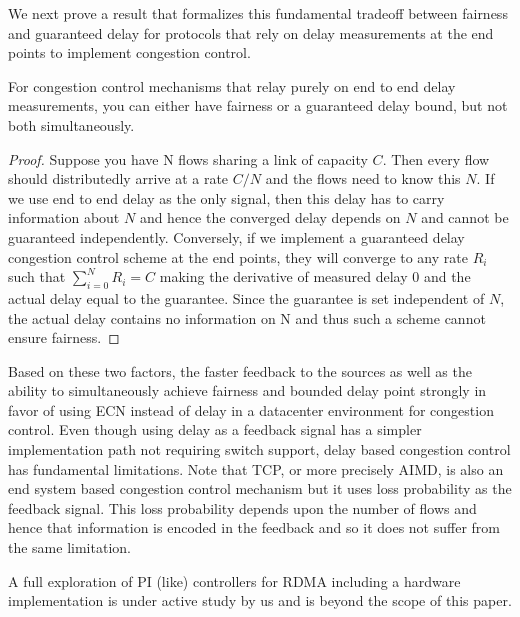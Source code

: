 We next prove a result that formalizes this fundamental tradeoff between fairness
and guaranteed delay for protocols that rely on delay measurements at the end
points to implement congestion control.

\begin{thm}
\label{thm:fairness-delay}
For congestion control mechanisms that relay purely on end to end
delay measurements, you can either have fairness or a guaranteed delay
bound, but not both simultaneously.
\end{thm}
\begin{proof}
Suppose you have N flows sharing a link of capacity $C$. Then every flow
should distributedly arrive at a rate $C/N$ and the flows need to know
this $N$. If we use end to end delay as the only signal, then this delay
has to carry information about $N$ and hence the converged delay
depends on $N$ and cannot be guaranteed independently. Conversely, if we implement a guaranteed delay congestion
control scheme at the end points, they
will converge to any rate $R_i$ such that $\sum_{i=0}^{N}R_i = C$
making the derivative of measured delay 0 and the actual delay equal
to the guarantee. Since the guarantee is set independent of $N$, the
actual delay contains no information on N and 
thus such a scheme cannot ensure fairness.
\end{proof}

\noindent
Based on these two factors, the faster feedback to the sources as well as the
ability to simultaneously achieve fairness and bounded delay point strongly in
favor of using ECN instead of delay in a datacenter environment for congestion
control. Even though using delay as a feedback signal has a simpler
implementation path not requiring switch support, delay based congestion control
has fundamental limitations. Note that TCP, or more precisely AIMD, is also an
end system based congestion control mechanism but it uses loss probability as
the feedback signal. This loss probability depends upon the number of flows and
hence that information is encoded in the feedback and so it does not suffer from
the same limitation. 

A full exploration of PI (like) controllers for RDMA including a hardware
implementation is under active study by us and is beyond the scope of this
paper.
